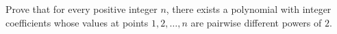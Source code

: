 Prove that for every positive integer $n$, there exists a polynomial with integer coefficients whose values at points $1,2,\dots,n$ are pairwise different powers of $2$.